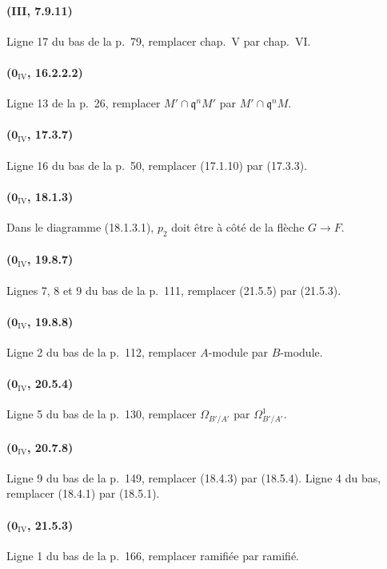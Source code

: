 \paragraph{(III, 7.9.11)}
Ligne 17 du bas de la p.~79, remplacer chap.~V par chap.~VI.

\paragraph{($\mathbf{0}_{\mathrm{IV}}$, 16.2.2.2)}
Ligne 13 de la p.~26, remplacer $M'\cap\mathfrak q^nM'$ par
$M'\cap\mathfrak q^nM$.

\paragraph{($\mathbf{0}_{\mathrm{IV}}$, 17.3.7)}
Ligne 16 du bas de la p.~50, remplacer (17.1.10) par (17.3.3).

\paragraph{($\mathbf{0}_{\mathrm{IV}}$, 18.1.3)}
Dans le diagramme (18.1.3.1), $p_2$ doit être à côté de la flèche
$G\to F$.

\paragraph{($\mathbf{0}_{\mathrm{IV}}$, 19.8.7)}
Lignes 7, 8 et 9 du bas de la p.~111, remplacer (21.5.5) par (21.5.3).

\paragraph{($\mathbf{0}_{\mathrm{IV}}$, 19.8.8)}
Ligne 2 du bas de la p.~112, remplacer $A$-module par $B$-module.

\paragraph{($\mathbf{0}_{\mathrm{IV}}$, 20.5.4)}
Ligne 5 du bas de la p.~130, remplacer $\Omega_{B'/A'}$ par
$\Omega^1_{B'/A'}$.

\paragraph{($\mathbf{0}_{\mathrm{IV}}$, 20.7.8)}
Ligne 9 du bas de la p.~149, remplacer (18.4.3) par (18.5.4). Ligne 4
du bas, remplacer (18.4.1) par (18.5.1).

\paragraph{($\mathbf{0}_{\mathrm{IV}}$, 21.5.3)}
Ligne 1 du bas de la p.~166, remplacer ramifiée par ramifié.

